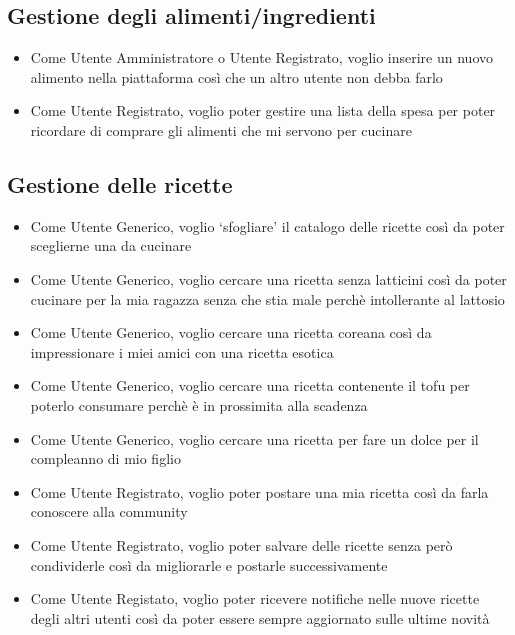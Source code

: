 \documentclass{article}
\begin{document}
\subsection{Gestione degli alimenti/ingredienti}
\begin{itemize}
    \item Come Utente Amministratore o Utente Registrato, voglio inserire un nuovo alimento nella piattaforma 
    così che un altro utente non debba farlo
    \item Come Utente Registrato, voglio poter gestire una lista della spesa per poter ricordare di comprare 
    gli alimenti che mi servono per cucinare
\end{itemize}

\subsection{Gestione delle ricette}
\begin{itemize}
    \item Come Utente Generico, voglio `sfogliare' il catalogo delle ricette così da poter sceglierne una da 
    cucinare
    \item Come Utente Generico, voglio cercare una ricetta senza latticini così da poter cucinare per la mia 
    ragazza senza che stia male perchè intollerante al lattosio
    \item Come Utente Generico, voglio cercare una ricetta coreana così da impressionare i miei amici con una
    ricetta esotica
    \item Come Utente Generico, voglio cercare una ricetta contenente il tofu per poterlo consumare perchè è 
    in prossimita alla scadenza
    \item Come Utente Generico, voglio cercare una ricetta per fare un dolce per il compleanno di mio figlio 
    \item Come Utente Registrato, voglio poter postare una mia ricetta così da farla conoscere alla community 
    \item Come Utente Registrato, voglio poter salvare delle ricette senza però condividerle così da migliorarle 
    e postarle successivamente
    \item Come Utente Registato, voglio poter ricevere notifiche nelle nuove ricette degli altri utenti 
    così da poter essere sempre aggiornato sulle ultime novità
\end{itemize}
\end{document}
